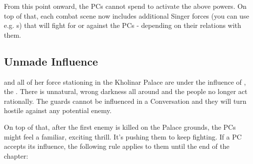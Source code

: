 From this point onward, the PCs cannot spend \iconOpp{} to activate the above powers. On top of that, each combat scene now includes additional Singer forces (you can use e.g. \enemySingerDireform{}s) that will fight for or against the PCs - depending on their relations with them.




\subsection{Unmade Influence}

\npcQueen{} and all of her force stationing in the Kholinar Palace are under the influence of \npcYeligNar{}, the \npcYeligNarTitle{}. There is unnatural, wrong darkness all around and the people no longer act rationally. The guards cannot be influenced in a Conversation and they will turn hostile against any potential enemy.

On top of that, after the first enemy is killed on the Palace grounds, the PCs might feel a familiar, exciting thrill. It's \npcThrill{} pushing them to keep fighting. If a PC accepts its influence, the following rule applies to them until the end of the chapter:




